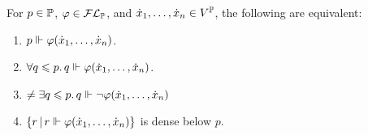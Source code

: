\documentclass{article}
\begin{document}
    \begin{fancyprop}{}
        For $p \in \mathbb{P}$, $\varphi \in \mathcal{F} \mathcal{L}_{\mathbb{P}}$, and $\dot{x}_{1}, \dots, \dot{x}_{n} \in V^{\mathbb{P}}$, the following are equivalent: \begin{enumerate}
            \item[(i)] $p \Vdash \varphi(\dot{x}_{1}, \dots, \dot{x}_{n})$.
            \item[(ii)] $\forall q \leqslant p. \, q \Vdash \varphi(\dot{x}_{1}, \dots, \dot{x}_{n})$.
            \item[(iii)] $\neq \exists q \leqslant p. \, q \Vdash \neg \varphi(\dot{x}_{1}, \dots, \dot{x}_{n})$
            \item[(iv)] $\{ r \, | \, r \Vdash \varphi(\dot{x}_{1}, \dots, \dot{x}_{n}) \}$ is dense below $p$.
        \end{enumerate}
    \end{fancyprop}
    \proof \hspace{0.1cm}
\end{document}
